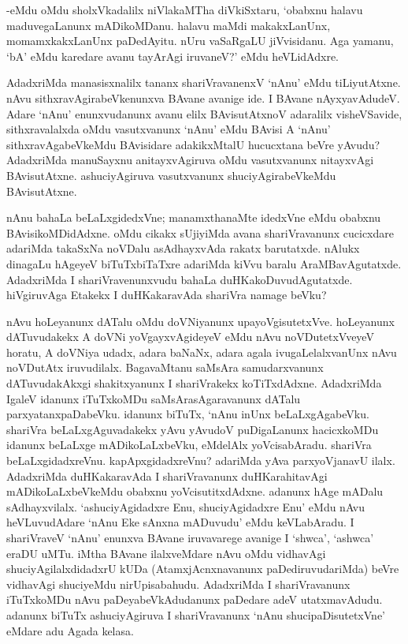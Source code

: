 -eMdu oMdu sholxVkadalilx niVlakaMTha diVkiSxtaru, `obabxnu halavu maduvegaLanunx mADikoMDanu. halavu maMdi makakxLanUnx, momamxkakxLanUnx paDedAyitu. nUru vaSaRgaLU jiVvisidanu. Aga yamanu, `bA' eMdu karedare avanu tayArAgi iruvaneV?' eMdu heVLidAdxre.

AdadxriMda manasisxnalilx tananx shariVravanenxV `nAnu' eMdu tiLiyutAtxne. nAvu sithxravAgirabeVkenunxva BAvane avanige ide. I BAvane nAyxyavAdudeV. Adare `nAnu' enunxvudanunx avanu elilx BAvisutAtxnoV adaralilx visheVSavide, sithxravalalxda oMdu vasutxvanunx `nAnu' eMdu BAvisi A `nAnu' sithxravAgabeVkeMdu BAvisidare adakikxMtalU hucucxtana beVre yAvudu? AdadxriMda manuSayxnu anitayxvAgiruva oMdu vasutxvanunx nitayxvAgi BAvisutAtxne. ashuciyAgiruva vasutxvanunx shuciyAgirabeVkeMdu BAvisutAtxne.

nAnu bahaLa beLaLxgidedxVne; manamxthanaMte idedxVne eMdu obabxnu BAvisikoMDidAdxne. oMdu cikakx sUjiyiMda avana shariVravanunx cucicxdare adariMda takaSxNa noVDalu asAdhayxvAda rakatx barutatxde. nAlukx dinagaLu hAgeyeV biTuTxbiTaTxre adariMda kiVvu baralu AraMBavAgutatxde. AdadxriMda I shariVravenunxvudu bahaLa duHKakoDuvudAgutatxde. hiVgiruvAga Etakekx I duHKakaravAda shariVra namage beVku?

nAvu hoLeyanunx dATalu oMdu doVNiyanunx upayoVgisutetxVve. hoLeyanunx dATuvudakekx A doVNi yoVgayxvAgideyeV eMdu nAvu noVDutetxVveyeV horatu, A doVNiya udadx, adara baNaNx, adara agala ivugaLelalxvanUnx nAvu noVDutAtx iruvudilalx. BagavaMtanu saMsAra samudarxvanunx dATuvudakAkxgi shakitxyanunx I shariVrakekx koTiTxdAdxne. AdadxriMda IgaleV idanunx iTuTxkoMDu saMsArasAgaravanunx dATalu parxyatanxpaDabeVku. idanunx biTuTx, `nAnu inUnx beLaLxgAgabeVku. shariVra beLaLxgAguvadakekx yAvu yAvudoV puDigaLanunx hacicxkoMDu idanunx beLaLxge mADikoLaLxbeVku, eMdelAlx yoVcisabAradu. shariVra beLaLxgidadxreVnu. kapApxgidadxreVnu? adariMda yAva parxyoVjanavU ilalx. AdadxriMda duHKakaravAda I shariVravanunx duHKarahitavAgi mADikoLaLxbeVkeMdu obabxnu yoVcisutitxdAdxne. adanunx hAge mADalu sAdhayxvilalx. `ashuciyAgidadxre Enu, shuciyAgidadxre Enu' eMdu nAvu heVLuvudAdare `nAnu Eke sAnxna mADuvudu' eMdu keVLabAradu. I shariVraveV `nAnu' enunxva BAvane iruvavarege avanige I `shwca', `ashwca' eraDU uMTu. iMtha BAvane ilalxveMdare nAvu oMdu vidhavAgi shuciyAgilalxdidadxrU kUDa (AtamxjAcnxnavanunx paDediruvudariMda) beVre vidhavAgi shuciyeMdu nirUpisabahudu. AdadxriMda I shariVravanunx iTuTxkoMDu nAvu paDeyabeVkAdudanunx paDedare adeV utatxmavAdudu. adanunx biTuTx ashuciyAgiruva I shariVravanunx `nAnu shucipaDisutetxVne' eMdare adu Agada kelasa.

